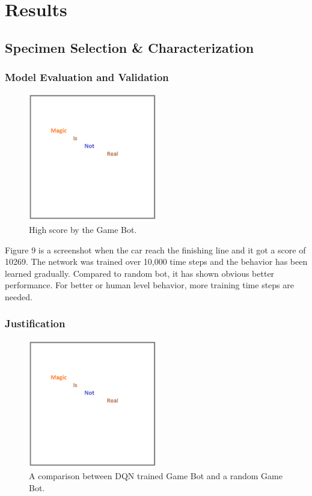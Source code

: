 \chapter{Results}
 
\section{Specimen Selection \& Characterization}

\subsection{Model Evaluation and Validation}

\begin{figure}[h]
\centering
\includegraphics[width=0.5\textwidth]{figs/magic}
\caption{High score by the Game Bot.}
\end{figure}

Figure 9 is a screenshot when the car reach the finishing line and it got a score of 10269. The network was trained over 10,000 time steps and the behavior has been learned gradually. Compared to random bot, it has shown obvious better performance. For better or human level behavior, more training time steps are needed.

\subsection{Justification}

\begin{figure}[h]
\centering
\includegraphics[width=0.5\textwidth]{figs/magic}
\caption{A comparison between DQN trained Game Bot and a random Game Bot.}
\end{figure}

